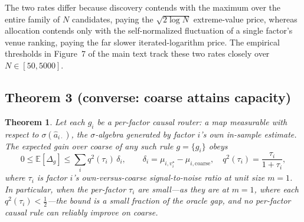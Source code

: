 \documentclass[12pt]{article}
\theoremstyle{plain}
\newtheorem{theorem}{Theorem}
\theoremstyle{definition}
\begin{document}
\noindent The two rates differ because discovery contends with the maximum over
the entire family of $N$ candidates, paying the $\sqrt{2\log N}$ extreme-value
price, whereas allocation contends only with the self-normalized fluctuation of a
single factor's venue ranking, paying the far slower iterated-logarithm price.
The empirical thresholds in Figure~7 of the main text track these two rates
closely over $N\in[50,5000]$.

\subsection{Theorem 3 (converse: coarse attains capacity)}
\label{ia:thm3}

\begin{theorem}
Let each $g_i$ be a per-factor causal router: a map measurable with respect to
$\sigma(\hat a_{i\cdot})$, the $\sigma$-algebra generated by factor $i$'s own
in-sample estimate. The expected gain over coarse of any such rule $g=\{g_i\}$
obeys
\[
0\le\mathbb{E}[\Delta_g]\le
\sum_i q^2(\tau_i)\,\delta_i,\qquad
\delta_i=\mu_{i,v^\star_i}-\mu_{i,\mathrm{coarse}},\quad
q^2(\tau_i)=\frac{\tau_i}{1+\tau_i},
\]
where $\tau_i$ is factor $i$'s own-versus-coarse signal-to-noise ratio at unit
size $m=1$. In particular, when the per-factor $\tau_i$ are small---as they are at
$m=1$, where each $q^2(\tau_i)<\tfrac12$---the bound is a small fraction of the
oracle gap, and no per-factor causal rule can reliably improve on coarse.
\end{theorem}
\end{document}
